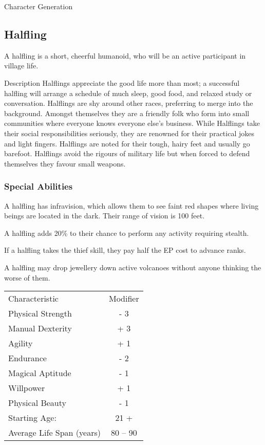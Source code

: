\begin{Chapter}{Character Generation}
\subsection{Halfling}

A halfling is a short, cheerful humanoid, who will be an active
participant in village life.

\begin{Description}
\item[Description] Halflings appreciate the good life more than most;
  a successful halfling will arrange a schedule of much sleep, good
  food, and relaxed study or conversation.  Halflings are shy around
  other races, preferring to merge into the background.  Amongst
  themselves they are a friendly folk who form into small communities
  where everyone knows everyone else’s business.  While Halflings take
  their social responsibilities seriously, they are renowned for their
  practical jokes and light fingers.  Halflings are noted for their
  tough, hairy feet and usually go barefoot. Halflings avoid the
  rigours of military life but when forced to defend themselves they
  favour small weapons.
\end{Description}

\subsubsection{Special Abilities}

\begin{Enumerate}

\item A halfling has infravision, which allows them to see faint red
  shapes where living beings are located in the dark. Their range of
  vision is 100 feet.

\item A halfling adds 20\% to their chance to perform any activity
  requiring stealth.

\item If a halfling takes the thief skill, they pay half the EP cost
  to advance ranks.

\item A halfling may drop jewellery down active volcanoes without
  anyone thinking the worse of them.

\end{Enumerate}

\begin{tabularx}{\columnwidth}{Xc}
Characteristic			& Modifier \\
Physical Strength		& - 3 \\
Manual Dexterity		& + 3 \\
Agility				& + 1 \\
Endurance			& - 2 \\
Magical Aptitude		& - 1 \\
Willpower			& + 1 \\
Physical Beauty			& - 1 \\
Starting Age:			& 21 + \\
Average Life Span (years)	& 80 -- 90 \\
\end{tabularx}


\end{Chapter}

